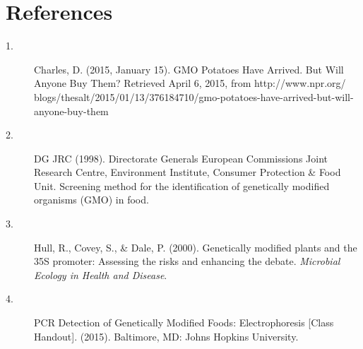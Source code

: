 \documentclass{article}
\begin{document}

\section*{References}

\begin{description}
   \item[1.] Charles, D. (2015, January 15). GMO Potatoes Have Arrived. But Will Anyone Buy Them? Retrieved April 6, 2015, from http://www.npr.org/ blogs/thesalt/2015/01/13/376184710/gmo-potatoes-have-arrived-but-will-anyone-buy-them

   \item[2.] DG JRC (1998). Directorate Generals European Commissions Joint Research Centre, Environment Institute, Consumer Protection \& Food Unit. Screening method for the identification of genetically modified organisms (GMO) in food.

   \item[3.] Hull, R., Covey, S., \& Dale, P. (2000). Genetically modified plants and the 35S promoter: Assessing the risks and enhancing the debate. \textit{Microbial Ecology in Health and Disease}.
 
   \item[4.] PCR Detection of Genetically Modified Foods: Electrophoresis [Class Handout]. (2015). Baltimore, MD: Johns Hopkins University.
   
\end{description}







%
 

%

\end{document}
